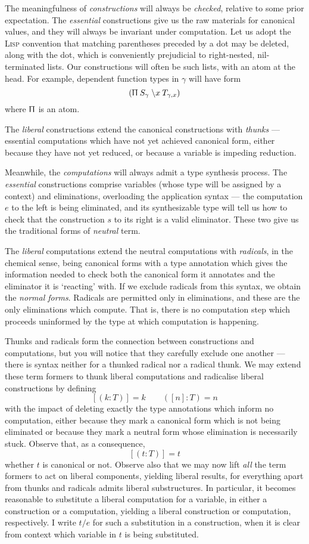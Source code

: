 \documentclass{jfp1}
\begin{document}
\newcommand{\PI}[3]{(\Uppi\:#1\;\la{#2}{#3})}
The meaningfulness of \emph{constructions} will always be
\emph{checked}, relative to some prior expectation. The
\emph{essential} constructions give us the raw materials for
canonical values, and they will always be invariant under computation.
Let us adopt the \textsc{Lisp} convention that matching parentheses
preceded by a dot may be deleted, along with the dot, which is
conveniently prejudicial to right-nested, nil-terminated lists. Our
constructions will often be such lists, with an atom at the head.
For example, dependent function types in $\gamma$ will have form
\[\PI {S_\gamma}x{T_{\gamma,x}}
\]
where $\Uppi$ is an atom.

The \emph{liberal} constructions extend the canonical constructions
with \emph{thunks} --- essential computations which have not yet achieved canonical
form, either because they have not yet reduced, or because a variable
is impeding reduction.

Meanwhile, the \emph{computations} will always admit a type synthesis
process. The \emph{essential} constructions comprise variables (whose
type will be assigned by a context) and eliminations, overloading the
application syntax --- the computation $e$ to the left is being
eliminated, and its synthesizable
type will tell us how to check that the construction $s$ to its right
is a valid eliminator. These two give us the traditional forms
of \emph{neutral} term.

The \emph{liberal} computations extend the neutral computations with
\emph{radicals}, in the chemical sense, being canonical forms with a
type annotation which gives the information needed to check both the
canonical form it annotates and the eliminator it is `reacting' with.
If we exclude radicals from this syntax, we obtain the \emph{normal
  forms}. Radicals are permitted only in eliminations, and these are
the only eliminations which compute. That is, there is no computation
step which proceeds uninformed by the type at which computation is
happening.

Thunks and radicals form the connection between constructions and
computations, but you will notice that they carefully exclude one
another --- there is syntax neither for a thunked radical nor a
radical thunk. We may extend these term formers to thunk liberal
computations and radicalise liberal constructions by defining
\[
  [(k:T)] = k \qquad ([n]:T) = n
\]
with the impact of deleting exactly the type annotations which inform
no computation, either because they mark a canonical form which is
not being eliminated or because they mark a neutral form whose
elimination is necessarily stuck. Observe that, as a consequence,
\[
  [(t:T)] = t
\]
whether $t$ is canonical or not. Observe also that we may now lift
\emph{all} the term formers to act on liberal components, yielding
liberal results, for everything apart from thunks and radicals admits
liberal substructures. In particular, it becomes reasonable to
substitute a liberal computation for a variable, in either a
construction or a computation, yielding a liberal construction or
computation, respectively. I write $t/e$ for such a substitution
in a construction, when it is clear from context which variable in
$t$ is being substituted.
\end{document}
